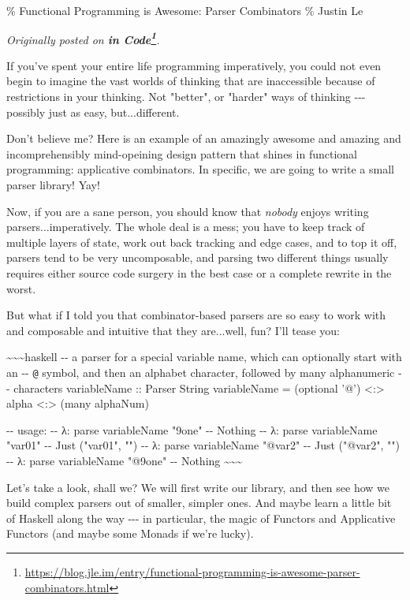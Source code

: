 \documentclass[]{article}
\renewcommand{\href}[2]{#2\footnote{\url{#1}}}
\begin{document}
\% Functional Programming is Awesome: Parser Combinators \% Justin Le

\emph{Originally posted on
\textbf{\href{https://blog.jle.im/entry/functional-programming-is-awesome-parser-combinators.html}{in
Code}}.}

If you've spent your entire life programming imperatively, you could not even
begin to imagine the vast worlds of thinking that are inaccessible because of
restrictions in your thinking. Not "better", or "harder" ways of thinking
-\/-\/- possibly just as easy, but...different.

Don't believe me? Here is an example of an amazingly awesome and amazing and
incomprehensibly mind-opeining design pattern that shines in functional
programming: applicative combinators. In specific, we are going to write a small
parser library! Yay!

Now, if you are a sane person, you should know that \emph{nobody} enjoys writing
parsers...imperatively. The whole deal is a mess; you have to keep track of
multiple layers of state, work out back tracking and edge cases, and to top it
off, parsers tend to be very uncomposable, and parsing two different things
usually requires either source code surgery in the best case or a complete
rewrite in the worst.

But what if I told you that combinator-based parsers are so easy to work with
and composable and intuitive that they are...well, fun? I'll tease you:

\textasciitilde{}\textasciitilde{}\textasciitilde{}haskell -\/- a parser for a
special variable name, which can optionally start with an -\/- \texttt{@}
symbol, and then an alphabet character, followed by many alphanumeric -\/-
characters variableName :: Parser String variableName = (optional '@')
\textless{}:\textgreater{} alpha \textless{}:\textgreater{} (many alphaNum)

-\/- usage: -\/- λ: parse variableName "9one" -\/- Nothing -\/- λ: parse
variableName "var01" -\/- Just ("var01", "") -\/- λ: parse variableName "@var2"
-\/- Just ("@var2", "") -\/- λ: parse variableName "@9one" -\/- Nothing
\textasciitilde{}\textasciitilde{}\textasciitilde{}

Let's take a look, shall we? We will first write our library, and then see how
we build complex parsers out of smaller, simpler ones. And maybe learn a little
bit of Haskell along the way -\/-\/- in particular, the magic of Functors and
Applicative Functors (and maybe some Monads if we're lucky).
\end{document}
